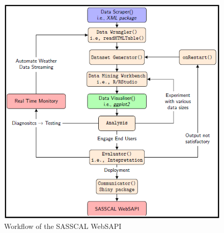 \documentclass[a4paper, 10pt, conference]{ieeeconf}      %
\begin{document}
\begin{figure}[h]
		\centering
		\includegraphics[width=1\linewidth]{fig/MiPipeLine}
		\caption{Workflow of the  SASSCAL WebSAPI}
		\label{Flw}
	\end{figure}
\noindent
\end{document}
